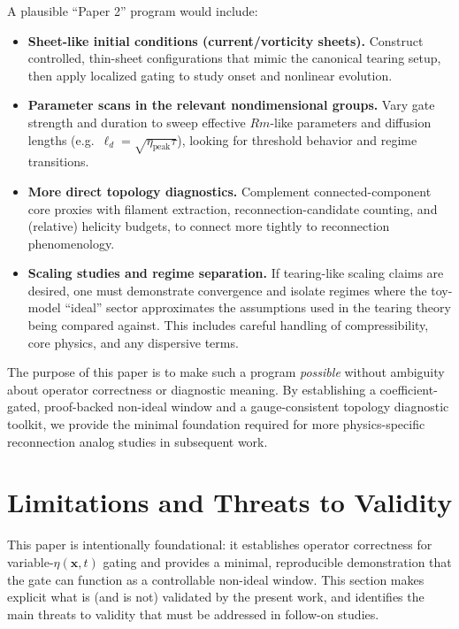 \documentclass[11pt]{article}
\theoremstyle{plain}
\theoremstyle{definition}
\theoremstyle{remark}
\begin{document}
A plausible ``Paper 2'' program would include:

\begin{itemize}[leftmargin=*]
  \item \textbf{Sheet-like initial conditions (current/vorticity sheets).}
  Construct controlled, thin-sheet configurations that mimic the canonical tearing setup, then apply
  localized gating to study onset and nonlinear evolution.

  \item \textbf{Parameter scans in the relevant nondimensional groups.}
  Vary gate strength and duration to sweep effective $Rm$-like parameters and diffusion lengths
  (e.g.\ $\ell_d=\sqrt{\eta_{\text{peak}}\tau}$), looking for threshold behavior and regime transitions.

  \item \textbf{More direct topology diagnostics.}
  Complement connected-component core proxies with filament extraction, reconnection-candidate counting,
  and (relative) helicity budgets, to connect more tightly to reconnection phenomenology.

  \item \textbf{Scaling studies and regime separation.}
  If tearing-like scaling claims are desired, one must demonstrate convergence and isolate regimes where
  the toy-model ``ideal'' sector approximates the assumptions used in the tearing theory being compared
  against. This includes careful handling of compressibility, core physics, and any dispersive terms.
\end{itemize}

The purpose of this paper is to make such a program \emph{possible} without ambiguity about operator
correctness or diagnostic meaning. By establishing a coefficient-gated, proof-backed non-ideal window
and a gauge-consistent topology diagnostic toolkit, we provide the minimal foundation required for more
physics-specific reconnection analog studies in subsequent work.

\section{Limitations and Threats to Validity}\label{sec:limitations}

This paper is intentionally foundational: it establishes operator correctness for variable-$\eta(\mathbf{x},t)$
gating and provides a minimal, reproducible demonstration that the gate can function as a controllable
non-ideal window. This section makes explicit what is (and is not) validated by the present work, and
identifies the main threats to validity that must be addressed in follow-on studies.
\end{document}
